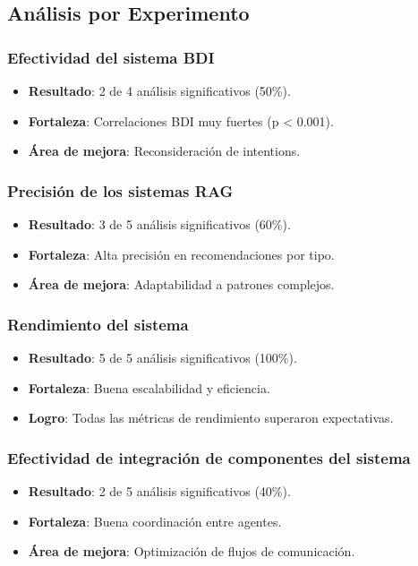 \documentclass[runningheads,a4paper]{llncs}
\begin{document}
\subsection{Análisis por Experimento}

\subsubsection{Efectividad del sistema BDI}
\begin{itemize}
    \item \textbf{Resultado}: 2 de 4 análisis significativos (50\%).
    \item \textbf{Fortaleza}: Correlaciones BDI muy fuertes (p < 0.001).
    \item \textbf{Área de mejora}: Reconsideración de intentions.
\end{itemize}

\subsubsection{Precisión de los sistemas RAG}
\begin{itemize}
    \item \textbf{Resultado}: 3 de 5 análisis significativos (60\%).
    \item \textbf{Fortaleza}: Alta precisión en recomendaciones por tipo.
    \item \textbf{Área de mejora}: Adaptabilidad a patrones complejos.
\end{itemize}

\subsubsection{Rendimiento del sistema}
\begin{itemize}
    \item \textbf{Resultado}: 5 de 5 análisis significativos (100\%).
    \item \textbf{Fortaleza}: Buena escalabilidad y eficiencia.
    \item \textbf{Logro}: Todas las métricas de rendimiento superaron expectativas.
\end{itemize}

\subsubsection{Efectividad de integración de componentes del sistema}
\begin{itemize}
    \item \textbf{Resultado}: 2 de 5 análisis significativos (40\%).
    \item \textbf{Fortaleza}: Buena coordinación entre agentes.
    \item \textbf{Área de mejora}: Optimización de flujos de comunicación.
\end{itemize}
\end{document}
